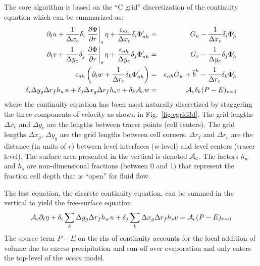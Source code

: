 The core algorithm is based on the ``C grid'' discretization of the
continuity equation which can be summarized as:
\begin{eqnarray}
\partial_t u + \frac{1}{\Delta x_c} \delta_i \left. \frac{ \partial \Phi}{\partial r}\right|_{s} \eta + \frac{\epsilon_{nh}}{\Delta x_c} \delta_i \Phi_{nh}' & = & G_u - \frac{1}{\Delta x_c} \delta_i \Phi_h' \label{eq:discrete-momu} \\
\partial_t v + \frac{1}{\Delta y_c} \delta_j \left. \frac{ \partial \Phi}{\partial r}\right|_{s} \eta + \frac{\epsilon_{nh}}{\Delta y_c} \delta_j \Phi_{nh}' & = & G_v - \frac{1}{\Delta y_c} \delta_j \Phi_h' \label{eq:discrete-momv} \\
\epsilon_{nh} \left( \partial_t w + \frac{1}{\Delta r_c} \delta_k \Phi_{nh}' \right) & = & \epsilon_{nh} G_w + \overline{b}^k - \frac{1}{\Delta r_c} \delta_k \Phi_{h}' \label{eq:discrete-momw} \\
\delta_i \Delta y_g \Delta r_f h_w u +
\delta_j \Delta x_g \Delta r_f h_s v +
\delta_k {\cal A}_c w & = & {\cal A}_c \delta_k (P-E)_{r=0}
\label{eq:discrete-continuity}
\end{eqnarray}
where the continuity equation has been most naturally discretized by
staggering the three components of velocity as shown in
Fig.~\ref{fig:cgrid3d}. The grid lengths $\Delta x_c$ and $\Delta y_c$
are the lengths between tracer points (cell centers). The grid lengths
$\Delta x_g$, $\Delta y_g$ are the grid lengths between cell
corners. $\Delta r_f$ and $\Delta r_c$ are the distance (in units of
$r$) between level interfaces (w-level) and level centers (tracer
level). The surface area presented in the vertical is denoted ${\cal
A}_c$.  The factors $h_w$ and $h_s$ are non-dimensional fractions
(between 0 and 1) that represent the fraction cell depth that is
``open'' for fluid flow.

The last equation, the discrete continuity equation, can be summed in
the vertical to yield the free-surface equation:
\begin{equation}
{\cal A}_c \partial_t \eta + \delta_i \sum_k \Delta y_g \Delta r_f h_w
u + \delta_j \sum_k \Delta x_g \Delta r_f h_s v = {\cal
A}_c(P-E)_{r=0} \label{eq:discrete-freesurface}
\end{equation}
The source term $P-E$ on the rhs of continuity accounts for the local
addition of volume due to excess precipitation and run-off over
evaporation and only enters the top-level of the {\em ocean} model.

